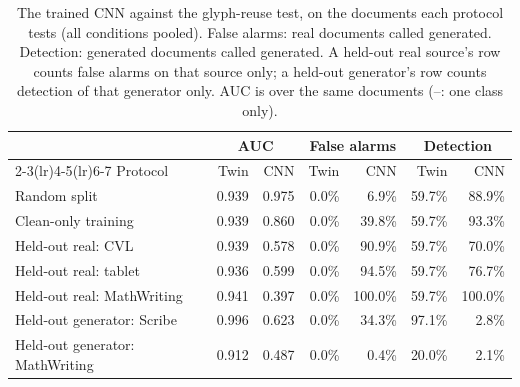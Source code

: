 \begin{table}[t]\centering\caption{The trained CNN against the glyph-reuse test, on the documents each protocol tests (all conditions pooled). False alarms: real documents called generated. Detection: generated documents called generated. A held-out real source's row counts false alarms on that source only; a held-out generator's row counts detection of that generator only. AUC is over the same documents (--: one class only).}\label{tab:protocols}
\footnotesize\begin{tabular}{@{}lrrrrrr@{}}\toprule
 & \multicolumn{2}{c}{AUC} & \multicolumn{2}{c}{False alarms} & \multicolumn{2}{c}{Detection} \\
\cmidrule(lr){2-3}\cmidrule(lr){4-5}\cmidrule(lr){6-7}
Protocol & Twin & CNN & Twin & CNN & Twin & CNN \\\midrule
Random split & 0.939 & 0.975 & 0.0\% & 6.9\% & 59.7\% & 88.9\% \\
Clean-only training & 0.939 & 0.860 & 0.0\% & 39.8\% & 59.7\% & 93.3\% \\
Held-out real: CVL & 0.939 & 0.578 & 0.0\% & 90.9\% & 59.7\% & 70.0\% \\
Held-out real: tablet & 0.936 & 0.599 & 0.0\% & 94.5\% & 59.7\% & 76.7\% \\
Held-out real: MathWriting & 0.941 & 0.397 & 0.0\% & 100.0\% & 59.7\% & 100.0\% \\
Held-out generator: Scribe & 0.996 & 0.623 & 0.0\% & 34.3\% & 97.1\% & 2.8\% \\
Held-out generator: MathWriting & 0.912 & 0.487 & 0.0\% & 0.4\% & 20.0\% & 2.1\% \\
\bottomrule\end{tabular}\end{table}
